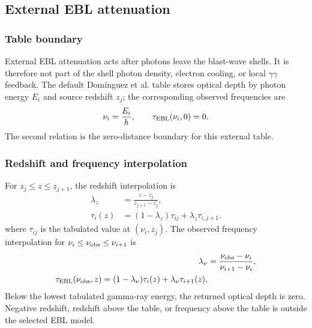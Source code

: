 \documentclass[twocolumn]{aastex702}
\begin{document}
\subsection{External EBL attenuation}

\subsubsection{Table boundary}

External EBL attenuation acts after photons leave the blast-wave shells.  It is
therefore not part of the shell photon density, electron cooling, or local
\(\gamma\gamma\) feedback.  The default Domínguez et al. table
\citep{Dominguez2011EBL} stores optical depth by photon energy \(E_i\) and source
redshift \(z_j\); the corresponding observed frequencies are
\begin{equation}
\begin{aligned}
\nu_i=\frac{E_i}{h}, \qquad
\tau_{\rm EBL}(\nu_i,0)=0 .
\end{aligned}
\end{equation}
The second relation is the zero-distance boundary for this external table.

\subsubsection{Redshift and frequency interpolation}

For \(z_j\le z\le z_{j+1}\), the redshift interpolation is
\begin{equation}
\begin{aligned}
\lambda_z&=\frac{z-z_j}{z_{j+1}-z_j},\\
\tau_i(z)&=(1-\lambda_z)\tau_{ij}
+\lambda_z\tau_{i,j+1}.
\end{aligned}
\end{equation}
where \(\tau_{ij}\) is the tabulated value at \((\nu_i,z_j)\).  The observed
frequency interpolation for \(\nu_i\le\nu_{\rm obs}\le\nu_{i+1}\) is
\begin{equation}
\begin{aligned}
\lambda_\nu&=\frac{\nu_{\rm obs}-\nu_i}{\nu_{i+1}-\nu_i},\\
\tau_{\rm EBL}(\nu_{\rm obs},z)=
(1-\lambda_\nu)\tau_i(z)+\lambda_\nu\tau_{i+1}(z).
\end{aligned}
\end{equation}
Below the lowest tabulated gamma-ray energy, the returned optical depth is zero.
Negative redshift, redshift above the table, or frequency above the table is
outside the selected EBL model.
\end{document}
